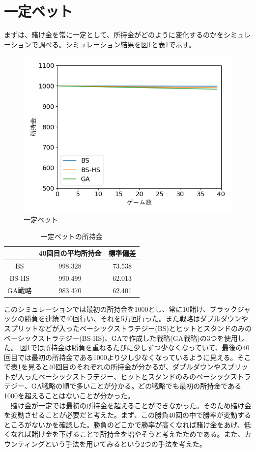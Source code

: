\section{一定ベット}
まずは、賭け金を常に一定として、所持金がどのように変化するのかをシミュレーションで調べる。シミュレーション結果を図\ref{betdife}と表\ref{bet}で示す。
\begin{figure}[H]
 \begin{center} 
  \includegraphics[width=0.7\linewidth]{./figure/bet-defineite-ver5}
  \caption{一定ベット\label{betdife}}
 \end{center}
\end{figure}

\begin{table}[H]
 \caption{一定ベットの所持金\label{bet}}
 \begin{center}
  \begin{tabular}{|c|c|c|}
  \hline  & 40回目の平均所持金 & 標準偏差 \\
  \hline BS & 998.328 & 73.538\\
  \hline BS-HS & 990.499 & 62.013 \\
  \hline GA戦略 & 983.470 & 62.401\\
  \hline
  \end{tabular}
 \end{center}
\end{table}

このシミュレーションでは最初の所持金を1000とし、常に10賭け、ブラックジャックの勝負を連続で40回行い、それを5万回行った。また戦略はダブルダウンやスプリットなどが入ったベーシックストラテジー(BS)とヒットとスタンドのみのベーシックストラテジー(BS-HS)、GAで作成した戦略(GA戦略)の3つを使用した。
 図\ref{betdife}では所持金は勝負を重ねるたびに少しずつ少なくなっていて、最後の40回目では最初の所持金である1000より少し少なくなっているように見える。そこで表\ref{bet}を見ると40回目のそれぞれの所持金が分かるが、ダブルダウンやスプリットが入ったベーシックストラテジー、ヒットとスタンドのみのベーシックストラテジー、GA戦略の順で多いことが分かる。どの戦略でも最初の所持金である1000を超えることはないことが分かった。\\
　賭け金が一定では最初の所持金を超えることができなかった。そのため賭け金を変動させることが必要だと考えた。まず、この勝負40回の中で勝率が変動するところがないかを確認した。勝負のどこかで勝率が高くなれば賭け金をあげ、低くなれば賭け金を下げることで所持金を増やそうと考えたためである。また、カウンティングという手法を用いてみるという2つの手法を考えた。

